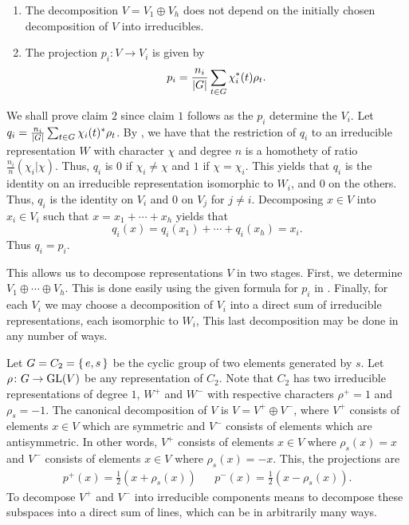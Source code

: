 \documentclass[letterpaper, 11pt, oneside]{book}
\begin{document}
\clearpage

\begin{thrm}\label{thrm:canonical_decomp_properties}
  \begin{enumerate}
  \item The decomposition $V = V_{1} \oplus V_{h}$ does not depend on the initially chosen decomposition of $V$ into irreducibles.
  \item The projection $p_{i}\colon V \to V_{i}$ is given by
        \[
          p_{i} = \frac{n_{i}}{\abs{G}} \sum_{t \in G} \chi_{i}^{*}(t) \rho_{t}.
        \]
  \end{enumerate}
\end{thrm}
\begin{pf}
  We shall prove claim $2$ since claim $1$ follows as the $p_{i}$ determine the $V_{i}$.
  Let $q_{i} = \frac{n_{i}}{\abs{G}} \sum_{t \in G} \chi_{i}(t)^{*} \rho_{t}$.
  By , we have that the restriction of $q_{i}$ to an irreducible representation $W$ with character $\chi$ and degree $n$ is a homothety of ratio $\frac{n_{i}}{n} (\chi_{i} | \chi)$.
  Thus, $q_{i}$ is $0$ if $\chi_{i} \neq \chi$ and $1$ if $\chi = \chi_{i}$.
  This yields that $q_{i}$ is the identity on an irreducible representation isomorphic to $W_{i}$, and $0$ on the others.
  Thus, $q_{i}$ is the identity on $V_{i}$ and $0$ on $V_{j}$ for $j \neq i$.
  Decomposing $x \in V$ into $x_{i} \in V_{i}$ such that $x = x_{1} + \cdots + x_{h}$ yields that
  \[
    q_{i}(x) = q_{i}(x_{1}) + \cdots + q_{i}(x_{h}) = x_{i}.
  \]
  Thus $q_{i} = p_{i}$.
\end{pf}

This allows us to decompose representations $V$ in two stages.
First, we determine $V_{1} \oplus \cdots \oplus V_{h}$.
This is done easily using the given formula for $p_{i}$ in .
Finally, for each $V_{i}$ we may choose a decomposition of $V_{i}$ into a direct sum of irreducible representations, each isomorphic to $W_{i}$,
This last decomposition may be done in any number of ways.

\begin{ex}[Decomposition of $C_{2}$]
  Let $G = C_{2} = \set{e, s}$ be the cyclic group of two elements generated by $s$.
  Let $\rho\colon G \to \operatorname{GL}(V)$ be any representation of $C_{2}$.
  Note that $C_{2}$ has two irreducible representations of degree $1$, $W^{+}$ and $W^{-}$ with respective characters $\rho^{+} = 1$ and $\rho_{s} = -1$.
  The canonical decomposition of $V$ is $V = V^{+} \oplus V^{-}$, where $V^{+}$ consists of elements $x \in V$ which are symmetric and $V^{-}$ consists of elements which are antisymmetric.
  In other words, $V^{+}$ consists of elements $x \in V$ where $\rho_{s}(x) = x$ and $V^{-}$ consists of elements $x \in V$ where $\rho_{s}(x) = -x$.
  This, the projections are
  \begin{align*}
    p^{+}(x) = \frac{1}{2}(x + \rho_{s}(x)) && p^{-}(x) = \frac{1}{2}(x - \rho_{s}(x)).
  \end{align*}
  To decompose $V^{+}$ and $V^{-}$ into irreducible components means to decompose these subspaces into a direct sum of lines, which can be in arbitrarily many ways.
\end{ex}
\end{document}
